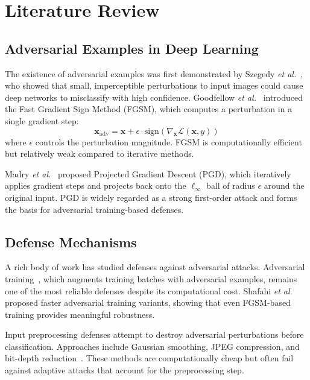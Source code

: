\documentclass[conference]{IEEEtran}
\newcommand{\x}{\mathbf{x}}
\newcommand{\grad}{\nabla}
\newcommand{\loss}{\mathcal{L}}
\newcommand{\etal}{\textit{et al.}}
\begin{document}
\section{Literature Review}

\subsection{Adversarial Examples in Deep Learning}

The existence of adversarial examples was first demonstrated by Szegedy \etal~\cite{szegedy2013intriguing}, who showed that small, imperceptible perturbations to input images could cause deep networks to misclassify with high confidence. Goodfellow \etal~\cite{goodfellow2014fgsm} introduced the Fast Gradient Sign Method (FGSM), which computes a perturbation in a single gradient step:
\begin{equation}
    \x_{\text{adv}} = \x + \epsilon \cdot \text{sign}(\grad_\x \loss(\x, y))
\end{equation}
where $\epsilon$ controls the perturbation magnitude. FGSM is computationally efficient but relatively weak compared to iterative methods.

Madry \etal~\cite{madry2018pgd} proposed Projected Gradient Descent (PGD), which iteratively applies gradient steps and projects back onto the $\ell_\infty$ ball of radius $\epsilon$ around the original input. PGD is widely regarded as a strong first-order attack and forms the basis for adversarial training-based defenses.

\subsection{Defense Mechanisms}

A rich body of work has studied defenses against adversarial attacks. Adversarial training~\cite{madry2018pgd}, which augments training batches with adversarial examples, remains one of the most reliable defenses despite its computational cost. Shafahi \etal~\cite{shafahi2019fast} proposed faster adversarial training variants, showing that even FGSM-based training provides meaningful robustness.

Input preprocessing defenses attempt to destroy adversarial perturbations before classification. Approaches include Gaussian smoothing, JPEG compression, and bit-depth reduction~\cite{guo2018input}. These methods are computationally cheap but often fail against adaptive attacks that account for the preprocessing step.
\end{document}
